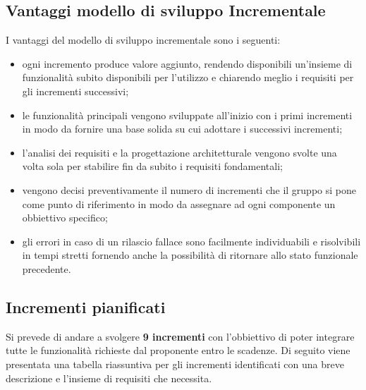 \subsection{Vantaggi modello di sviluppo Incrementale}
I vantaggi del modello di sviluppo incrementale sono i seguenti:
\begin{itemize}
	\item ogni incremento produce valore aggiunto, rendendo disponibili un'insieme di funzionalità subito disponibili per l'utilizzo e chiarendo meglio i requisiti per gli incrementi successivi;
	\item le funzionalità principali vengono sviluppate all'inizio con i primi incrementi in modo da fornire una base solida su cui adottare i successivi incrementi;
	\item l'analisi dei requisiti e la progettazione architetturale vengono svolte una volta sola per stabilire fin da subito i requisiti fondamentali;
	\item vengono decisi preventivamente il numero di incrementi che il gruppo si pone come punto di riferimento in modo da assegnare ad ogni componente un obbiettivo specifico;
	\item gli errori in caso di un rilascio fallace sono facilmente individuabili e risolvibili in tempi stretti fornendo anche la possibilità di ritornare allo stato funzionale precedente.
\end{itemize}

\subsection{Incrementi pianificati}\label{_incrementi}

Si prevede di andare a svolgere \textbf{9 incrementi} con l'obbiettivo di poter integrare tutte le funzionalità richieste dal proponente entro le scadenze. Di seguito viene presentata una tabella riassuntiva per gli incrementi identificati con una breve descrizione e l'insieme di requisiti che necessita.

